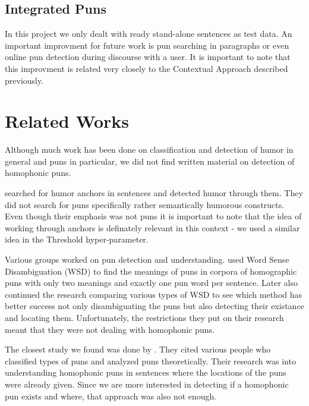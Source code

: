 \documentclass[11pt,a4paper]{article}
\begin{document}
\subsection{Integrated Puns}
In this project we only dealt with ready stand-alone sentences as test data. An important improvment for future work is pun searching in paragraphs or even online pun detection during discourse with a user. It is important to note that this improvment is related very closely to the Contextual Approach described previously.

\section{Related Works}

Although much work has been done on classification and detection of humor in general and puns in particular, we did not find written material on detection of homophonic puns.

\citet{yang_lavie_dyer_hovy_2015} searched for humor anchors in sentences and detected humor through them. They did not search for puns specifically rather semantically humorous constructs. Even though their emphasis was not puns it is important to note that the idea of working through anchors is definately relevant in this context - we used a similar idea in the Threshold hyper-parameter.

Various groups worked on pun detection and understanding. \citet{miller_gurevych_2015} used Word Sense Disambiguation (WSD) to find the meanings of puns in corpora of homographic puns with only two meanings and exactly one pun word per sentence. Later \citet{miller_hempelmann_gurevych_2017} also continued the research comparing various types of WSD to see which method has better success not only disambiguating the puns but also detecting their existance and locating them. Unfortunately, the restrictions they put on their research meant that they were not dealing with homophonic puns.

The closest study we found was done by \citet{jaech_koncel-kedziorski_ostendorf_2016}. They cited various people who classified types of puns and analyzed puns theoretically. Their research was into understanding homophonic puns in sentences where the locations of the puns were already given. Since we are more interested in detecting if a homophonic pun exists and where, that approach was also not enough.

%
% 






\end{document}
